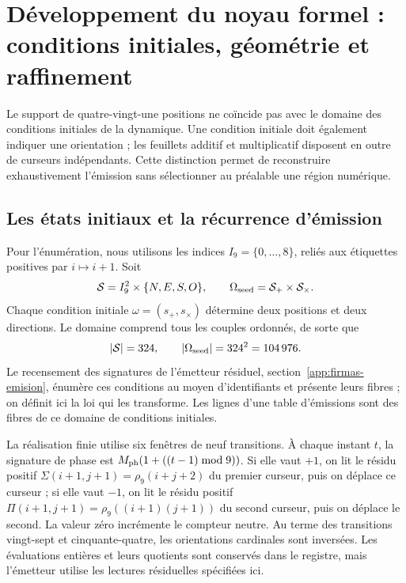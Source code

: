 \section{Développement du noyau formel : conditions initiales, géométrie et raffinement}
\label{sec:extension}

Le support de quatre-vingt-une positions ne coïncide pas avec le domaine des conditions initiales de la dynamique. Une condition initiale doit également indiquer une orientation ; les feuillets additif et multiplicatif disposent en outre de curseurs indépendants. Cette distinction permet de reconstruire exhaustivement l’émission sans sélectionner au préalable une région numérique.

\subsection{Les états initiaux et la récurrence d’émission}

Pour l’énumération, nous utilisons les indices \(I_9=\{0,\ldots,8\}\), reliés aux étiquettes positives par \(i\mapsto i+1\). Soit
\[
 \mathcal S=I_9^2\times\{N,E,S,O\},\qquad
 \Omega_{\rm seed}=\mathcal S_+\times\mathcal S_\times.
\]
Chaque condition initiale \(\omega=(s_+,s_\times)\) détermine deux positions et deux directions. Le domaine comprend tous les couples ordonnés, de sorte que
\begin{equation}
 |\mathcal S|=324,\qquad |\Omega_{\rm seed}|=324^2=104\,976.
 \label{eq:semillas}
\end{equation}
Le recensement des signatures de l'émetteur résiduel, section~\ref{app:firmas-emision}, énumère ces conditions au moyen d'identifiants et présente leurs fibres ; on définit ici la loi qui les transforme. Les lignes d'une table d'émissions sont des fibres de ce domaine de conditions initiales.

La réalisation finie utilise six fenêtres de neuf transitions. À chaque instant \(t\), la signature de phase est \(M_{\rm ph}(1+((t-1)\bmod9))\). Si elle vaut \(+1\), on lit le résidu positif \(\Sigma(i+1,j+1)=\rho_9(i+j+2)\) du premier curseur, puis on déplace ce curseur ; si elle vaut \(-1\), on lit le résidu positif \(\Pi(i+1,j+1)=\rho_9((i+1)(j+1))\) du second curseur, puis on déplace le second. La valeur zéro incrémente le compteur neutre. Au terme des transitions vingt-sept et cinquante-quatre, les orientations cardinales sont inversées. Les évaluations entières et leurs quotients sont conservés dans le registre, mais l’émetteur utilise les lectures résiduelles spécifiées ici.

